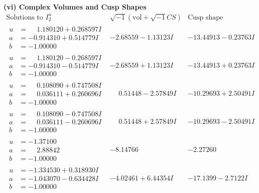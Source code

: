 \documentclass[1p]{elsarticle_modified}
\theoremstyle{definition}
\newcommand{\I}{\sqrt{-1}}
\begin{document}
\newpage\flushleft \textbf{(vi) Complex Volumes and Cusp Shapes}
$$\begin{array}{c|c|c}  
\text{Solutions to }I^u_{2}& \I (\text{vol} + \sqrt{-1}CS) & \text{Cusp shape}\\
 \hline 
\begin{aligned}
u &= \phantom{-}1.180120 + 0.268597 I \\
a &= -0.914310 + 0.514779 I \\
b &= -1.00000\phantom{ +0.000000I}\end{aligned}
 & -2.68559 - 1.13123 I & -13.44913 - 0.23763 I \\ \hline\begin{aligned}
u &= \phantom{-}1.180120 - 0.268597 I \\
a &= -0.914310 - 0.514779 I \\
b &= -1.00000\phantom{ +0.000000I}\end{aligned}
 & -2.68559 + 1.13123 I & -13.44913 + 0.23763 I \\ \hline\begin{aligned}
u &= \phantom{-}0.108090 + 0.747508 I \\
a &= \phantom{-}0.036111 + 0.260696 I \\
b &= -1.00000\phantom{ +0.000000I}\end{aligned}
 & \phantom{-}0.51448 - 2.57849 I & -10.29693 + 2.50491 I \\ \hline\begin{aligned}
u &= \phantom{-}0.108090 - 0.747508 I \\
a &= \phantom{-}0.036111 - 0.260696 I \\
b &= -1.00000\phantom{ +0.000000I}\end{aligned}
 & \phantom{-}0.51448 + 2.57849 I & -10.29693 - 2.50491 I \\ \hline\begin{aligned}
u &= -1.37100\phantom{ +0.000000I} \\
a &= \phantom{-}2.88842\phantom{ +0.000000I} \\
b &= -1.00000\phantom{ +0.000000I}\end{aligned}
 & -8.14766\phantom{ +0.000000I} & -2.27260\phantom{ +0.000000I} \\ \hline\begin{aligned}
u &= -1.334530 + 0.318930 I \\
a &= -1.043070 - 0.634428 I \\
b &= -1.00000\phantom{ +0.000000I}\end{aligned}
 & -4.02461 + 6.44354 I & -17.1399 - 2.7122 I \\ \hline\begin{aligned}

\end{aligned}
\end{array}$$
\end{document}
